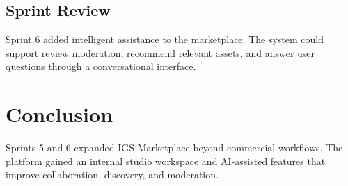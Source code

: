 \subsection{Sprint Review}

Sprint 6 added intelligent assistance to the marketplace. The system could support review
moderation, recommend relevant assets, and answer user questions through a conversational
interface.

\section*{Conclusion}
Sprints 5 and 6 expanded IGS Marketplace beyond commercial workflows. The platform gained an
internal studio workspace and AI-assisted features that improve collaboration, discovery, and
moderation.
